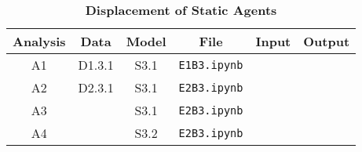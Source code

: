 \documentclass[10pt]{article}
\begin{document}
\begin{table}[!ht]
\caption{
\bf{Displacement of Static Agents}}
\begin{tabular}{|c|c|c|c|c|c|}
\hline
Analysis & Data & Model & File & Input & Output\\
\hline
A1 & D1.3.1 & S3.1 & \texttt{E1B3.ipynb} & & \\
A2 & D2.3.1 & S3.1 & \texttt{E2B3.ipynb} & & \\
A3 & \centering{D2.3.1 D2.3.2 D2.3.3} & S3.1 & \texttt{E2B3.ipynb} & & \\
A4 & \centering{D2.3.1 D2.3.2 D2.3.3} & S3.2 & \texttt{E2B3.ipynb} & & \\
\hline
\end{tabular}
\begin{flushleft}
\end{flushleft}
\label{tab:ip}
\end{table}
\end{document}
